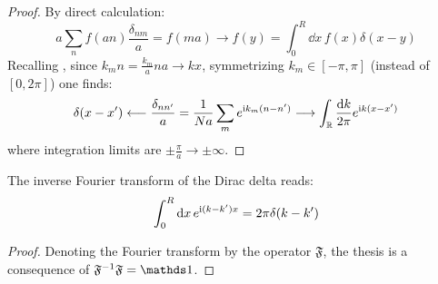 \begin{proofbox}
  \begin{proof}
  By direct calculation:
  \begin{equation*}
    a \sum_{n} f(an) \frac{\delta_{nm}}{a} = f(ma) \longrightarrow f(y) = \int_0^R \dd x\, f(x) \delta(x - y)
  \end{equation*}
  Recalling , since $ k_m n = \frac{k_m}{a} na \rightarrow k x $, symmetrizing $ k_m \in [-\pi, \pi] $ (instead of $ [0, 2\pi] $) one finds:
  \begin{equation*}
    \delta(x - x') \longleftarrow \frac{\delta_{nn'}}{a} = \frac{1}{Na} \sum_{m} e^{\mathrm{i} k_m (n - n')} \longrightarrow \int_{\mathbb{R}} \frac{\mathrm{d} k}{2\pi} e^{\mathrm{i} k (x - x')}
  \end{equation*}
  where integration limits are $ \pm \frac{\pi}{a} \rightarrow \pm \infty $.
\end{proof}
\end{proofbox}

\begin{proposition}{}{}
  The inverse Fourier transform of the Dirac delta reads:
  \begin{equation}
    \int_0^R \mathrm{d} x\, e^{\mathrm{i} (k - k') x} = 2\pi \delta(k - k')
  \end{equation}
\end{proposition}

\begin{proofbox}
  \begin{proof}
    Denoting the Fourier transform by the operator $ \mathfrak{F} $, the thesis is a consequence of $ \mathfrak{F}^{-1} \mathfrak{F} = \id $.
  \end{proof}
\end{proofbox}

